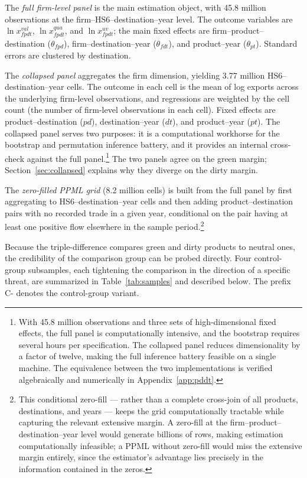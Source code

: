 \documentclass[12pt]{article}
\begin{document}
The \emph{full firm-level panel} is the main estimation object, with 45.8 million
observations at the firm--HS6--destination--year level. The outcome variables are
$\ln x^{val}_{fpdt}$, $\ln x^{qua}_{fpdt}$, and $\ln x^{uv}_{fpdt}$; the main fixed
effects are firm--product--destination ($\theta_{fpd}$), firm--destination--year
($\theta_{fdt}$), and product--year ($\theta_{pt}$). Standard errors are clustered by
destination.

The \emph{collapsed panel} aggregates the firm dimension, yielding 3.77 million
HS6--destination--year cells. The outcome in each cell is the mean of log exports across
the underlying firm-level observations, and regressions are weighted by the cell count
(the number of firm-level observations in each cell). Fixed effects are
product--destination ($pd$), destination--year ($dt$), and product--year ($pt$). The
collapsed panel serves two purposes: it is a computational workhorse for the bootstrap
and permutation inference battery, and it provides an internal cross-check against the
full panel.\footnote{With 45.8 million observations and three sets of high-dimensional
fixed effects, the full panel is computationally intensive, and the bootstrap requires
several hours per specification. The collapsed panel reduces dimensionality by a
factor of twelve, making the full inference battery feasible on a single machine. The
equivalence between the two implementations is verified algebraically and numerically
in Appendix~\ref{app:pddt}.} The two panels agree on the green margin; Section~\ref{sec:collapsed} explains why they diverge on the dirty margin.

The \emph{zero-filled PPML grid} (8.2 million cells) is built from the full panel by
first aggregating to HS6--destination--year cells and then adding product--destination
pairs with no recorded trade in a given year, conditional on the pair having at least one
positive flow elsewhere in the sample period.\footnote{This conditional zero-fill --- rather than a
complete cross-join of all products, destinations, and years --- keeps the grid
computationally tractable while capturing the relevant extensive margin. A zero-fill at the firm--product--destination--year level would generate
billions of rows, making estimation computationally infeasible; a PPML without zero-fill would miss the
extensive margin entirely, since the estimator's advantage lies precisely in the
information contained in the zeros.}

Because the triple-difference compares green and dirty products to neutral ones, the
credibility of the comparison group can be probed directly. Four control-group subsamples,
each tightening the comparison in the direction of a specific threat, are summarized in
Table~\ref{tab:samples} and described below. The prefix C- denotes the control-group variant.
\end{document}
